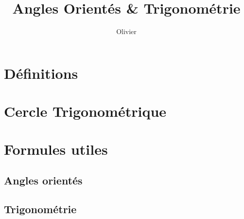 \documentclass[12pt,a4paper]{article}
\author{Olivier}
\date{}
\title{Angles Orientés \& Trigonométrie }
\begin{document}
\maketitle



\section{Définitions}
%
\begin{multicols}{2}
	
\end{multicols}
%

\section{Cercle Trigonométrique}

\begin{center}

\end{center}
%
%
\section{Formules utiles}
%
\subsection*{Angles orientés}
%
\begin{multicols}{2}

\end{multicols}
%
%
\subsection*{Trigonométrie}
%
\begin{multicols}{2}
	
\end{multicols}
%
%
%
%
%
%
%
%
\end{document}
